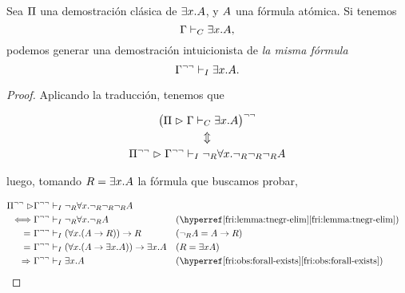 \begin{theorem}
    \label{fri:thm:fri-sigmaone}

    Sea $\Pi$ una demostración clásica de $\exists x . A$, y
    $A$ una fórmula atómica.
    Si tenemos
    \[
        \Gamma \vdash_C \exists x . A,
    \]
    podemos generar una demostración intuicionista de \textit{la misma fórmula}
    \[
        \Gamma^{\neg\neg} \vdash_I \exists x . A.
    \]
\end{theorem}
\begin{proof}

    Aplicando la traducción, tenemos que

    \begin{gather*}
        \big(
            \Pi \vartriangleright \Gamma \vdash_C \exists x . A
            \big)^{\neg\neg}\\
        \Updownarrow\\
        \Pi^{\neg\neg} \vartriangleright \Gamma^{\neg\neg} \vdash_I \neg_R \forall x . \neg_R \neg_R \neg_R A
    \end{gather*}

    luego, tomando $R = \exists x . A$ la fórmula que buscamos probar,

    \begin{align*}
        \transDNeg{\someProof} \proves & \transDNeg{\ctx} \judgI \fNotR \forall \var . \fNotR \fNotR \fNotR \form                                                                                                                  \\
        \iff                           & \transDNeg{\ctx} \judgI \fNotR \forall \var . \fNotR \form
                                       &                                                                                                                    & (\text{\namedref{fri:lemma:tnegr-elim}})                             \\
        =\                             & \transDNeg{\ctx} \judgI (\forall \var . (\form \rightarrow R)) \rightarrow R
                                       &                                                                                                                    & (\fNotR \form = \form \fImp R)                                       \\
        =\                             & \transDNeg{\ctx} \judgI (\forall \var . (\form \rightarrow \exists \var . \form)) \rightarrow \exists \var . \form &                                           & (R = \exists \var \form) \\
        \Rightarrow\                   & \transDNeg{\ctx} \judgI \exists \var . \form
                                       &                                                                                                                    & (\text{\namedref{fri:obs:forall-exists}})
    \end{align*}


\end{proof}
